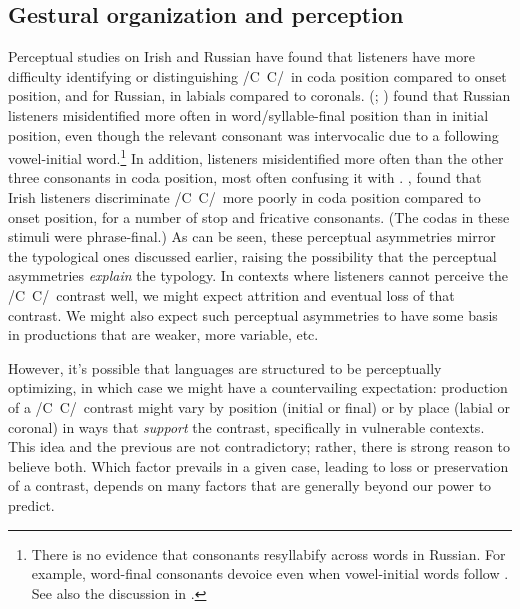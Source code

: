 \documentclass[output=paper,colorlinks,citecolor=brown]{langscibook}
\newcommand{\pal}{\ipa{ʲ}}
\newcommand{\vel}{\ipa{ˠ}}
\newcommand{\palvelcon}{/C\vel\ C\pal/}
\begin{document}
\subsection{Gestural organization and perception}\label{sec:timing&contrast}
Perceptual studies on Irish and Russian have found that listeners have more difficulty identifying or distinguishing \palvelcon\ in coda position compared to onset position, and for Russian, in labials compared to coronals. \citeauthor{Kochetov2002_diss}  (\citeyear{Kochetov2002_diss}; \citeyear{Kochetov2004_perception_place}) found that Russian listeners misidentified  more often in word\slash syllable\hyp final position than in initial position, even though the relevant consonant was intervocalic due to a following vowel-initial word.\footnote{There is no evidence that consonants resyllabify across words in Russian. For example, word\hyp final consonants devoice even when vowel-initial words follow \citep[see discussion in][]{Padgett_Myers2014_domain_generalization}. See also the discussion in .} In addition, listeners misidentified  more often than the other three consonants in coda position, most often confusing it with . \citet{NiChiosain_Padgett2012_Irish_pal_acous_percep},  \citet{Padgett_NiChiosain2018_Russian_Irish_pal_percep} found that Irish listeners discriminate \palvelcon\ more poorly in coda position compared to onset position, for a number of stop and fricative consonants. (The codas in these stimuli were phrase-final.) As can be seen, these perceptual asymmetries mirror the typological ones discussed earlier, raising the possibility that the perceptual asymmetries \emph{explain} the typology. In contexts where listeners cannot perceive the \palvelcon\ contrast well, we might expect attrition and eventual loss of that contrast. We might also expect such perceptual asymmetries to have some basis in productions that are weaker, more variable, etc.

However, it's possible that languages are structured to be perceptually optimizing, in which case we might have a countervailing expectation: production of a \palvelcon\ contrast might vary by position (initial or final) or by place (labial or coronal) in ways that \emph{support} the contrast, specifically in vulnerable contexts. This idea and the previous are not contradictory; rather, there is strong reason to believe both. Which factor prevails in a given case, leading to loss or preservation of a contrast, depends on many factors that are generally beyond our power to predict.
\end{document}

